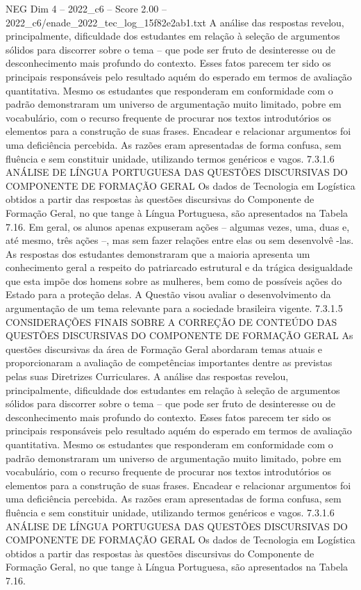 \begin{textsample}{NEG Dim 4 – 2022\_c6 – Score 2.00 – 2022\_c6/enade\_2022\_tec\_log\_15f82e2ab1.txt}
A análise das respostas revelou, principalmente, dificuldade dos estudantes em relação à seleção de argumentos sólidos para discorrer sobre o tema – que pode ser fruto de desinteresse ou de desconhecimento mais profundo do contexto.
Esses fatos parecem ter sido os principais responsáveis pelo resultado aquém do esperado em termos de avaliação quantitativa.
Mesmo os estudantes que responderam em conformidade com o padrão demonstraram um universo de argumentação muito limitado, pobre em vocabulário, com o recurso frequente de procurar nos textos introdutórios os elementos para a construção de suas frases.
Encadear e relacionar argumentos foi uma deficiência percebida.
As razões eram apresentadas de forma confusa, sem fluência e sem constituir unidade, utilizando termos genéricos e vagos. 7.3.1.6 ANÁLISE DE LÍNGUA PORTUGUESA DAS QUESTÕES DISCURSIVAS DO COMPONENTE DE FORMAÇÃO GERAL Os dados de Tecnologia em Logística obtidos a partir das respostas às questões discursivas do Componente de Formação Geral, no que tange à Língua Portuguesa, são apresentados na Tabela 7.16.
Em geral, os alunos apenas expuseram ações – algumas vezes, uma, duas e, até mesmo, três ações –, mas sem fazer relações entre elas ou sem desenvolvê -las.
As respostas dos estudantes demonstraram que a maioria apresenta um conhecimento geral a respeito do patriarcado estrutural e da trágica desigualdade que esta impõe dos homens sobre as mulheres, bem como de possíveis ações do Estado para a proteção delas.
A Questão visou avaliar o desenvolvimento da argumentação de um tema relevante para a sociedade brasileira vigente. 7.3.1.5 CONSIDERAÇÕES FINAIS SOBRE A CORREÇÃO DE CONTEÚDO DAS QUESTÕES DISCURSIVAS DO COMPONENTE DE FORMAÇÃO GERAL As questões discursivas da área de Formação Geral abordaram temas atuais e proporcionaram a avaliação de competências importantes dentre as previstas pelas suas Diretrizes Curriculares.
A análise das respostas revelou, principalmente, dificuldade dos estudantes em relação à seleção de argumentos sólidos para discorrer sobre o tema – que pode ser fruto de desinteresse ou de desconhecimento mais profundo do contexto.
Esses fatos parecem ter sido os principais responsáveis pelo resultado aquém do esperado em termos de avaliação quantitativa.
Mesmo os estudantes que responderam em conformidade com o padrão demonstraram um universo de argumentação muito limitado, pobre em vocabulário, com o recurso frequente de procurar nos textos introdutórios os elementos para a construção de suas frases.
Encadear e relacionar argumentos foi uma deficiência percebida.
As razões eram apresentadas de forma confusa, sem fluência e sem constituir unidade, utilizando termos genéricos e vagos. 7.3.1.6 ANÁLISE DE LÍNGUA PORTUGUESA DAS QUESTÕES DISCURSIVAS DO COMPONENTE DE FORMAÇÃO GERAL Os dados de Tecnologia em Logística obtidos a partir das respostas às questões discursivas do Componente de Formação Geral, no que tange à Língua Portuguesa, são apresentados na Tabela 7.16.

\end{textsample}
